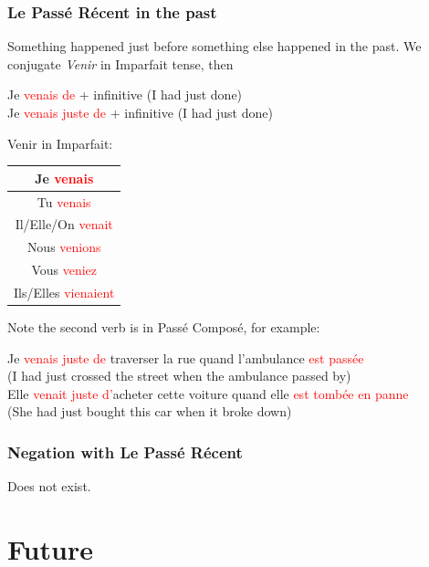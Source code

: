 \documentclass{book}
\begin{document}
\subsection{Le Passé Récent in the past}
Something happened just before something else happened in the past. We conjugate \textit{Venir} in Imparfait tense, then
\begin{center}
    Je \textcolor{red}{venais de} + infinitive (I had just done) \\
    Je \textcolor{red}{venais juste de} + infinitive (I had just done)
\end{center}
Venir in Imparfait:
\begin{center}
    \begin{tabular}{|c|}
        \hline
        Je \textcolor{red}{venais} \\
        \hline
        Tu \textcolor{red}{venais} \\
        \hline
        Il/Elle/On \textcolor{red}{venait} \\
        \hline
        Nous \textcolor{red}{venions} \\
        \hline
        Vous \textcolor{red}{veniez} \\
        \hline
        Ils/Elles \textcolor{red}{vienaient} \\
        \hline
    \end{tabular}
\end{center}
Note the second verb is in Passé Composé, for example:
\begin{center}
    Je \textcolor{red}{venais juste de} traverser la rue quand l'ambulance \textcolor{red}{est passée} \\
    (I had just crossed the street when the ambulance passed by) \\
    Elle \textcolor{red}{venait juste d'}acheter cette voiture quand elle \textcolor{red}{est tombée en panne} \\
    (She had just bought this car when it broke down)
\end{center}

\subsection{Negation with Le Passé Récent}
Does not exist.

\chapter{Future}
\end{document}
